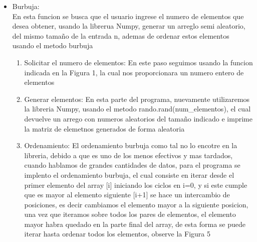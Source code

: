 \documentclass[12pt]{article}
\begin{document}
\begin{itemize}
\begin{enumerate}
	\end{enumerate}

	
\item Burbuja:\\
En esta funcion se busca que el usuario ingrese el numero de elementos que desea obtener, usando la librerua Numpy, generar un arreglo semi aleatorio, del mismo tamaño de la entrada n, ademas de ordenar estos elementos usando el metodo burbuja
	\begin{enumerate}
	\item Solicitar el numero de elementos: En este paso seguimos usando la funcion indicada en la Figura 1, la cual nos proporcionara un numero entero de elementos
	\item Generar elementos: En esta parte del programa, nuevamente utilizaremos la libreria Numpy, usando el metodo rando.rand(num\_elementos), el cual devuelve un arrego con numeros aleatorios del tamaño indicado e imprime la matriz de elemetnos generados de forma aleatoria
	\item Ordenamiento: El ordenamiento burbuja como tal no lo encotre en la libreria, debido a que es uno de los menos efectivos y mas tardados, cuando hablamos de grandes cantidades de datos, para el programa se implento el ordenamiento burbuja, el cual consiste en iterar desde el primer elemento del array [i] iniciando los ciclos en i=0, y si este cumple que es mayor al elemento siguiente [i+1] se hace un intercambio de posiciones, es decir cambiamos el elemento mayor a la siguiente posicion, una vez que iteramos sobre todos los pares de elementos, el elemento mayor habra quedado en la parte final del array, de esta forma se puede iterar hasta ordenar todos los elementos, observe la Figura 5
		

\end{enumerate}
\end{itemize}
\end{document}
